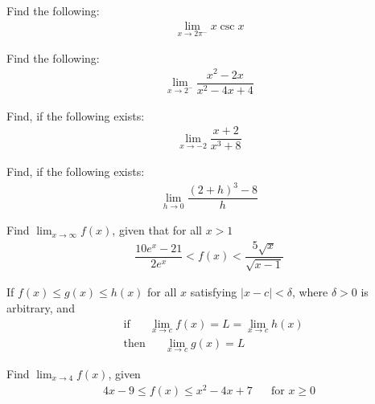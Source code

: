 \begin{exercise}
Find the following:
\begin{align*}
    \lim_{x \longrightarrow 2\pi^{-}} x\csc x
\end{align*}
\end{exercise}

\begin{exercise}
Find the following:
\begin{align*}
    \lim_{x \longrightarrow 2^{-}} \dfrac{x^{2}-2x}{x^{2}-4x+4}
\end{align*}
\end{exercise}

\begin{exercise}
Find, if the following exists:
\begin{align*}
    \lim_{x \longrightarrow -2} \dfrac{x+2}{x^{3}+8}
\end{align*}
\end{exercise}

\begin{exercise}
Find, if the following exists:
\begin{align*}
    \lim_{h \longrightarrow 0} \dfrac{(2+h)^{3}-8}{h}
\end{align*}
\end{exercise}

\begin{exercise}
Find $\lim_{x \longrightarrow \infty} f(x)$, given that for all $x>1$
\begin{align*}
    \dfrac{10e^{x} - 21}{2e^{x}} < f(x) < \dfrac{5\sqrt{x}}{\sqrt{x-1}}
\end{align*}
\end{exercise}

\begin{theorem}
If $f(x) \leq g(x) \leq h(x)$ for all $x$ satisfying $\lvert x - c \rvert < \delta$, where $\delta > 0$ is arbitrary, and
\begin{align*}
    &\text{if} \hspace{20pt} \lim_{x \longrightarrow c} f(x) = L = \lim_{x \longrightarrow c} h(x)\\[2ex]
    &\text{then} \hspace{20pt} \lim_{x \longrightarrow c} g(x) = L
\end{align*}
\end{theorem}

\begin{exercise}
Find $\lim_{x \longrightarrow 4} f(x)$, given
\begin{align*}
    4x-9 \leq f(x) \leq x^{2} - 4x + 7 \hspace{20pt} \text{for} \hspace{4pt} x \geq 0
\end{align*}
\end{exercise}

